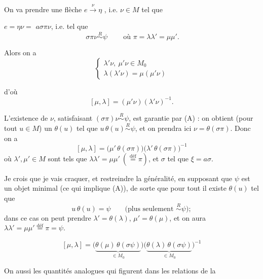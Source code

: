 \documentclass[11pt,a4paper]{article}
\begin{document}

On va  prendre une flèche $e \xrightarrow{\ \nu\ } \eta$
\ill{}, i.e. $\nu \in M$ tel que


$e = \eta\nu =$ \struck{\ill{}} $a\sigma\pi\nu$, i.e. tel que
\[
  \boxed{\ \sigma\pi\nu \overset{R}{\sim} \psi\ }
  \qquad\text{où } \pi = \lambda\lambda' = \mu\mu' .
\]

Alors on a
\[
  \begin{cases}
    \lambda'\nu,\ \mu'\nu \in M_0 \\
    \lambda(\lambda'\nu) = \mu(\mu'\nu)
  \end{cases}
\]


d'où
\[
  [\mu,\lambda] = (\mu'\nu)(\lambda'\nu)^{-1} .
\]

L'existence de $\nu$, satisfaisant $(\sigma\pi)\nu \overset{R}{\sim} \psi$, est
garantie par (A) : on obtient (pour tout $u \in M$) un $\theta(u)$ tel que
$u\,\theta(u) \overset{R}{\sim} \psi$, et on prendra ici
$\nu = \theta(\sigma\pi)$. Donc on a
\[
  [\mu,\lambda] = \bigl(\mu'\,\theta(\sigma\pi)\bigr)\bigl(\lambda'\,\theta(\sigma\pi)\bigr)^{-1}
\]
où $\lambda', \mu' \in M$ sont tels que
$\lambda\lambda' = \mu\mu'\ (\overset{\text{déf}}{=} \pi)$, et $\sigma$
 \struck{\ill{}} tel que $\xi = a\sigma$.

Je crois que je vais craquer, et restreindre la généralité, en supposant \ill{}
que $\psi$ est un objet minimal (ce qui implique (A)), de sorte que pour tout
 il existe $\theta(u)$ tel que
\[
  u\,\theta(u) = \psi \qquad \text{(plus seulement } \overset{R}{\sim} \psi\text{)} ;
\]
dans ce cas \ill{} on peut prendre $\lambda' = \theta(\lambda)$,
$\mu' = \theta(\mu)$, et on aura
$\lambda\lambda' = \mu\mu' \overset{\text{déf}}{=} \pi = \psi$.


\[
  [\mu,\lambda] = \bigl(\underbrace{\theta(\mu)\,\theta(\sigma\psi)}_{\in M_0}\bigr)
  \bigl(\underbrace{\theta(\lambda)\,\theta(\sigma\psi)}_{\in M_0}\bigr)^{-1}
\]

On \ill{} aussi \ill{} les quantités analogues qui figurent dans les relations de
la \ill{}

\end{document}

